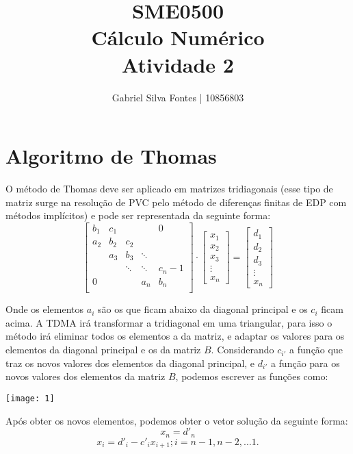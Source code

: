 \documentclass[12pt]{article}
\title{SME0500 \\ Cálculo Numérico \\ Atividade 2}
\author{Gabriel Silva Fontes | 10856803}
\begin{document}
\maketitle
\section{Algoritmo de Thomas}
O método de Thomas deve ser aplicado em matrizes tridiagonais (esse tipo de matriz surge na resolução de PVC pelo método de diferenças finitas de EDP com métodos implícitos) e pode ser representada da seguinte forma:
\[
    \begin{bmatrix}
        b_1 & c_1 &        &        & 0     \\
        a_2 & b_2 & c_2    &        &       \\
            & a_3 & b_3    & \ddots &       \\
            &     & \ddots & \ddots & c_n-1 \\
        0   &     &        & a_n    & b_n   \\
    \end{bmatrix}
    \cdot
    \begin{bmatrix}
        x_1 \\
        x_2 \\
        x_3 \\
        \vdots \\
        x_n
    \end{bmatrix}
    =
    \begin{bmatrix}
        d_1 \\
        d_2 \\
        d_3 \\
        \vdots \\
        x_n
    \end{bmatrix}
\]

Onde os elementos \(a_i\) são os que ficam abaixo da diagonal principal e os \(c_i\) ficam acima. A TDMA irá transformar a tridiagonal em uma triangular, para isso o método irá eliminar todos os elementos a da matriz, e adaptar os valores para os elementos da diagonal principal e os da matriz \(B\). Considerando \(c_{i'}\) a função que traz os novos valores dos elementos da diagonal principal, e \(d_{i'}\) a função para os novos valores dos elementos da matriz \(B\), podemos escrever as funções como:

\texttt{[image: 1]}

Após obter os novos elementos, podemos obter o vetor solução da seguinte forma:
\[
    x_n = d'_n
\]
\[
    x_i = d'_i - c'_i x_{i+1}; i = n - 1, n -2, \dots 1.
\]
\end{document}
